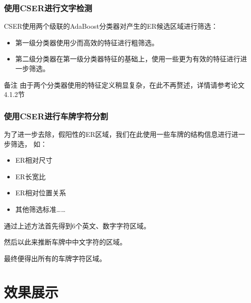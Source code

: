\documentclass[UTF8]{beamer}
\begin{document}
\begin{frame}
  \frametitle{使用CSER进行文字检测}
  
  CSER使用两个级联的AdaBoost分类器对产生的ER候选区域进行筛选：

  \begin{itemize}
  \item 第一级分类器使用少而高效的特征进行粗筛选。
  \item 第二级分类器在第一级分类器特征的基础上，使用一些更为有效的特征进行进一步筛选。
  \end{itemize}
  
  \begin{block}{备注}
    由于两个分类器使用的特征定义稍显复杂，在此不再赘述，详情请参考论文4.1.2节
  \end{block}
\end{frame}

\begin{frame}
  \frametitle{使用CSER进行车牌字符分割}
  
  为了进一步去除，假阳性的ER区域，我们在此使用一些车牌的结构信息进行进一步筛选，
  如：
  
  \begin{itemize}
    \item ER相对尺寸
    \item ER长宽比
    \item ER相对位置关系
    \item 其他筛选标准……
  \end{itemize}

  通过上述方法首先得到6个英文、数字字符区域。

  然后以此来推断车牌中中文字符的区域。

  最终便得出所有的车牌字符区域。
\end{frame}

\section{效果展示}
\end{document}
